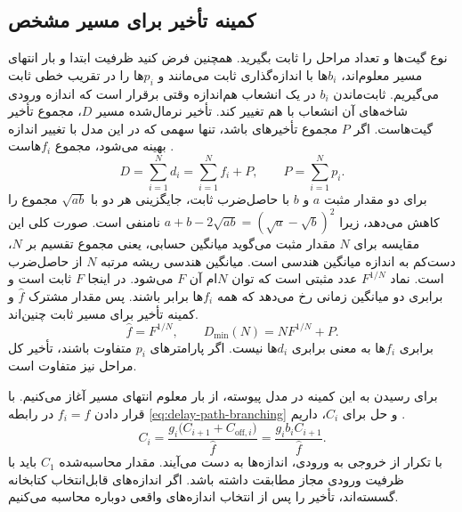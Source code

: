 \subsection{کمینه تأخیر برای مسیر مشخص}
\label{sec:delay-path-equal-effort}

نوع گیت‌ها و تعداد مراحل را ثابت بگیرید. همچنین فرض کنید
ظرفیت ابتدا و بار انتهای مسیر معلوم‌اند، \(b_i\)ها با
اندازه‌گذاری ثابت می‌مانند و \(p_i\)ها را در تقریب خطی ثابت
می‌گیریم. ثابت‌ماندن \(b_i\) در یک انشعاب هم‌اندازه وقتی
برقرار است که اندازه ورودی شاخه‌های آن انشعاب با هم تغییر کند.
تأخیر نرمال‌شده مسیر \(D\)، مجموع تأخیر گیت‌هاست. اگر
\(P\) مجموع تأخیرهای  باشد، تنها سهمی که در
این مدل با تغییر اندازه بهینه می‌شود، مجموع \(f_i\)هاست
\cite[روابط  تا ، صفحات ۱۶۴ و ۱۶۵]{weste}
\cite[اسلایدهای ۱۷ و ۱۸]{logicaleffortslides}.
\begin{equation}
  D=\sum_{i=1}^{N}d_i=\sum_{i=1}^{N}f_i+P,
  \qquad P=\sum_{i=1}^{N}p_i.
  \label{eq:delay-path-sum}
\end{equation}
برای دو مقدار مثبت \(a\) و \(b\) با حاصل‌ضرب ثابت، جایگزینی
هر دو با \(\sqrt{ab}\) مجموع را کاهش می‌دهد، زیرا
\(a+b-2\sqrt{ab}=(\sqrt a-\sqrt b)^2\) نامنفی است.
صورت کلی این مقایسه برای \(N\) مقدار مثبت می‌گوید میانگین
حسابی، یعنی مجموع تقسیم بر \(N\)، دست‌کم به اندازه میانگین
هندسی است. میانگین هندسی ریشه مرتبه \(N\) از حاصل‌ضرب است.
نماد \(F^{1/N}\) عدد مثبتی است که توان \(N\)ام آن \(F\)
می‌شود. در اینجا \(F\) ثابت است و برابری دو میانگین زمانی
رخ می‌دهد که همه \(f_i\)ها برابر باشند. پس مقدار مشترک
\(\widehat f\) و کمینه تأخیر برای مسیر ثابت چنین‌اند.
\begin{equation}
  \widehat f=F^{1/N},
  \qquad
  D_{\min}(N)=N F^{1/N}+P.
  \label{eq:delay-path-minimum}
\end{equation}
برابری \(f_i\)ها به معنی برابری \(d_i\)ها نیست. اگر
پارامترهای \(p_i\) متفاوت باشند، تأخیر کل مراحل نیز متفاوت است.

برای رسیدن به این کمینه در مدل پیوسته، از بار معلوم انتهای
مسیر آغاز می‌کنیم. با قرار دادن \(f_i=\widehat f\) در رابطه
\eqref{eq:delay-path-branching} و حل برای \(C_i\)، داریم
\cite[رابطه ، صفحه ۱۶۵]{weste}
\cite[اسلاید ۲۰]{logicaleffortslides}.
\begin{equation}
  C_i=
  \frac{g_i\bigl(C_{i+1}+C_{\mathrm{off},i}\bigr)}{\widehat f}
  =\frac{g_i b_i C_{i+1}}{\widehat f}.
  \label{eq:delay-path-backward-sizing}
\end{equation}
با تکرار از خروجی به ورودی، اندازه‌ها به دست می‌آیند. مقدار
محاسبه‌شده \(C_1\) باید با ظرفیت ورودی مجاز مطابقت داشته باشد.
اگر اندازه‌های قابل‌انتخاب کتابخانه گسسته‌اند، تأخیر را پس از
انتخاب اندازه‌های واقعی دوباره محاسبه می‌کنیم.

